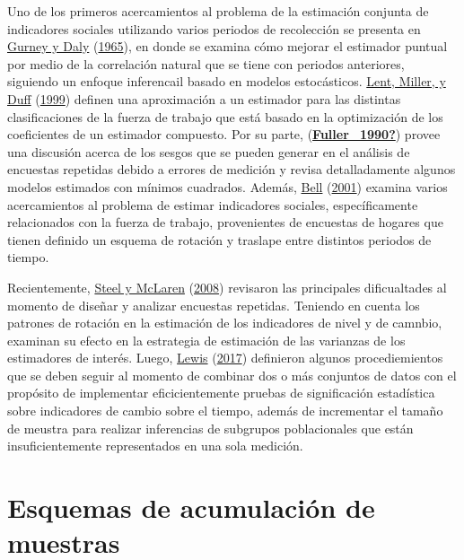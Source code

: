 \documentclass[
  12pt,
  spanish,
]{book}
\begin{document}
Uno de los primeros acercamientos al problema de la estimación conjunta de indicadores sociales utilizando varios periodos de recolección se presenta en \protect\hyperlink{ref-Gurney_Daly_1965}{Gurney y Daly} (\protect\hyperlink{ref-Gurney_Daly_1965}{1965}), en donde se examina cómo mejorar el estimador puntual por medio de la correlación natural que se tiene con periodos anteriores, siguiendo un enfoque inferencail basado en modelos estocásticos. \protect\hyperlink{ref-Lent_Miller_Duff_1999}{Lent, Miller, y Duff} (\protect\hyperlink{ref-Lent_Miller_Duff_1999}{1999}) definen una aproximación a un estimador para las distintas clasificaciones de la fuerza de trabajo que está basado en la optimización de los coeficientes de un estimador compuesto. Por su parte, (\protect\hyperlink{ref-Fuller_1990}{\textbf{Fuller\_1990?}}) provee una discusión acerca de los sesgos que se pueden generar en el análisis de encuestas repetidas debido a errores de medición y revisa detalladamente algunos modelos estimados con mínimos cuadrados. Además, \protect\hyperlink{ref-Bell_2001}{Bell} (\protect\hyperlink{ref-Bell_2001}{2001}) examina varios acercamientos al problema de estimar indicadores sociales, específicamente relacionados con la fuerza de trabajo, provenientes de encuestas de hogares que tienen definido un esquema de rotación y traslape entre distintos periodos de tiempo.

Recientemente, \protect\hyperlink{ref-Steel_McLaren_2008}{Steel y McLaren} (\protect\hyperlink{ref-Steel_McLaren_2008}{2008}) revisaron las principales dificualtades al momento de diseñar y analizar encuestas repetidas. Teniendo en cuenta los patrones de rotación en la estimación de los indicadores de nivel y de camnbio, examinan su efecto en la estrategia de estimación de las varianzas de los estimadores de interés. Luego, \protect\hyperlink{ref-Lewis_2017}{Lewis} (\protect\hyperlink{ref-Lewis_2017}{2017}) definieron algunos procediemientos que se deben seguir al momento de combinar dos o más conjuntos de datos con el propósito de implementar eficicientemente pruebas de significación estadística sobre indicadores de cambio sobre el tiempo, además de incrementar el tamaño de meustra para realizar inferencias de subgrupos poblacionales que están insuficientemente representados en una sola medición.

\hypertarget{esquemas-de-acumulaciuxf3n-de-muestras}{%
\section{Esquemas de acumulación de muestras}\label{esquemas-de-acumulaciuxf3n-de-muestras}}
\end{document}
